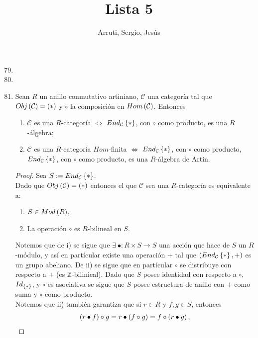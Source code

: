 \documentclass{article}
\title{Lista 5}
\author{Arruti, Sergio, Jesús}
\date{}
\begin{document}
	\maketitle
	\begin{enumerate}[label=\textbf{Ej \arabic*.}]
		\setcounter{enumi}{78}
		\item
		\item
		\item Sean $R$ un anillo conmutativo artiniano, $\mathcal{C}$ una categoría tal que $Obj\left(\mathcal{C}\right)=\left(*\right)$ y $\circ$ la composición en $Hom\left(\mathcal{C}\right)$. Entonces
		\begin{enumerate}
			\item $\mathcal{C}$ es una $R$-categoría $\iff$ $End_{\mathcal{C}}\left\{*\right\}$, con $\circ$ como producto, es una $R$-álgebra;
			\item $\mathcal{C}$ es una $R$-categoría $Hom$-finita $\iff$ $End_{\mathcal{C}}\left\{*\right\}$, con $\circ$ como producto, $End_{\mathcal{C}}\left\{*\right\}$, con $\circ$ como producto, es una $R$-álgebra de Artin.
		\end{enumerate}
		\begin{proof}
			Sea $S:=End_{\mathcal{C}}\left\{*\right\}$.\\
			 Dado que $Obj\left(\mathcal{C}\right)=\left(*\right)$ entonces el que $\mathcal{C}$ sea una $R$-categoría es equivalente a:
			\begin{enumerate}[label=\roman*)]
				\item $S\in Mod\left(R\right)$,
				\item La operación $\circ$ es $R$-bilineal en $S$.
			\end{enumerate} 
			Notemos que de i) se sigue que $\exists\ \bullet:R\times S\to S$ una acción que hace de $S$ un $R$-módulo, y así en partícular existe una operación $+$ tal que $\left(End_{\mathcal{C}}\left\{*\right\},+\right)$ es un grupo abeliano. De ii) se sigue que en partícular $\circ$ se distribuye con respecto a $+$ (es $\mathbb{Z}$-bilinieal). Dado que $S$ posee identidad con respecto a $\circ$, $Id_{\left\{*\right\}}$, y $\circ$ es asociativa se sigue que $S$ posee estructura de anillo con $+$ como suma y $\circ$ como producto.\\
			Notemos que ii) también garantiza que si $r\in R$ y $f,g\in S$, entonces
			\begin{align*}
				\left(r\bullet f\right)\circ g=r\bullet\left(f\circ g\right)=f\circ\left(r\bullet g\right),
			\end{align*}

\end{proof}
\end{enumerate}
\end{document}

